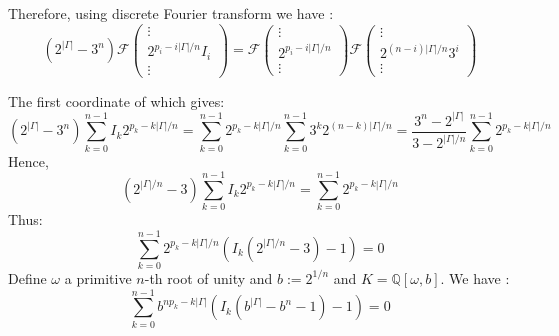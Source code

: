 \documentclass[12pt,a4paper]{article}
\begin{document}
Therefore, using discrete Fourier transform we have :
$$\left(2^{|\Gamma|}-3^n\right)\mathcal F\begin{pmatrix}
 \vdots \\ 2^{p_{i}-i|\Gamma|/n}I_i \\ \vdots
\end{pmatrix}=\mathcal F\begin{pmatrix}
\vdots\\
2^{p_{i}-i|\Gamma|/n}\\
\vdots
\end{pmatrix} 
\mathcal F
\begin{pmatrix}
\vdots \\ 2^{(n-i)|\Gamma|/n}3^{i}\\ \vdots
\end{pmatrix}
$$ 

The first coordinate of which gives:
 $$\left( 2^{|\Gamma|}-3^n\right)\sum_{k = 0}^{n-1} I_k 2^{p_k-k|\Gamma|/n}  = 
 \sum_{k=0}^{n-1}2^{p_{k}-k|\Gamma|/n}  \sum_{k=0}^{n-1}3^{k}2^{(n-k)|\Gamma|/n}  
 =\frac{3^{n}-2^{|\Gamma|}}{3-2^{|\Gamma|/n}}\sum_{k=0}^{n-1}2^{p_{k}-k|\Gamma|/n} $$
Hence, 
 $$\left( 2^{|\Gamma|/n}-3\right)\sum_{k = 0}^{n-1} I_k 2^{p_k-k|\Gamma|/n}   
 =\sum_{k=0}^{n-1}2^{p_{k}-k|\Gamma|/n} $$
Thus:
$$\sum_{k = 0}^{n-1} 2^{p_k-k|\Gamma|/n}\left(I_k\left( 2^{|\Gamma|/n}-3\right)-1\right)   
 =0$$
 Define $\omega$ a primitive $n$-th root of unity and $b:=2^{1/n}$ and 
 $K=\mathbb Q[\omega,b]$.
 We have :
 $$\sum_{k = 0}^{n-1} b^{np_k-k|\Gamma|}\left(I_k\left( b^{|\Gamma|}-b^n-1\right)-1\right)   
 =0$$
	
\end{document}
